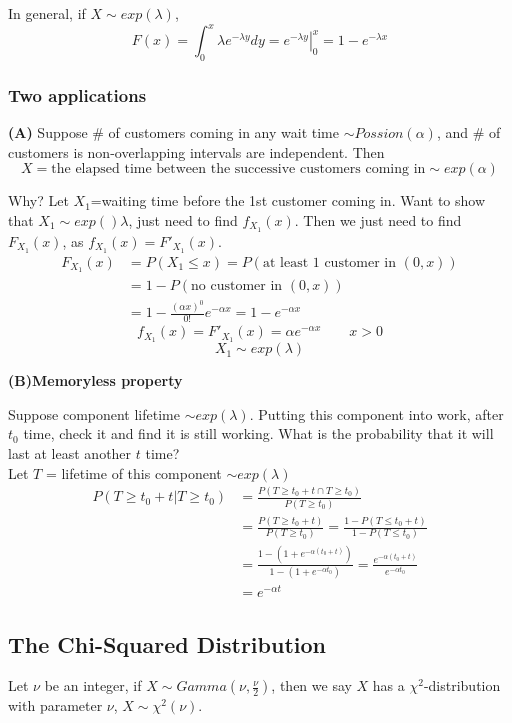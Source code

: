 In general, if $X\sim exp(\lambda)$,
\[F(x)=\int_0^{x} \lambda e^{-\lambda y} dy=\left. e^{-\lambda y}\right|_{0}^{x}=1-e^{-\lambda x}\]

\subsubsection{Two applications}
\textbf{(A)} Suppose \# of customers coming in any wait time $\sim Possion(\alpha)$, and \# of customers is non-overlapping intervals are independent. Then
\[X= \text{the elapsed time between the successive customers coming in}\sim exp(\alpha)\]

Why? Let $X_1$=waiting time before the 1st customer coming in. Want to show that $X_1 \sim exp()\lambda$, just need to find $f_{X_1}(x)$. Then we just need to find $F_{X_1}(x)$, as $f_{X_1}(x)=F'_{X_1}(x)$.
\begin{align*}
F_{X_1}(x)&= P(X_1\leq x)=P(\text{at least 1 customer in }(0,x)) \\
&= 1-P(\text{no customer in }(0,x)) \\
&=1-\frac{(\alpha x)^0}{0!}e^{-\alpha x}=1-e^{-\alpha x}
\end{align*}
\[f_{X_1}(x)=F'_{X_1}(x)=\alpha e^{-\alpha x} \qquad x>0\]
\[X_1 \sim exp(\lambda)\]


\textbf{(B)Memoryless property}

Suppose component lifetime $\sim exp(\lambda)$. Putting this component into work, after $t_0$ time, check it and find it is still working. What is the probability that it will last at least another $t$ time?\\
Let $T$ = lifetime of this component $\sim exp(\lambda)$
\begin{align*}
P(T\geq t_0+t|T \geq t_0)&=\frac{P(T\geq t_0+t \cap T \geq t_0)}{P(T \geq t_0)} \\
&=\frac{P(T\geq t_0+t)}{P(T \geq t_0)}=\frac{1-P(T\leq t_0+t)}{1-P(T \leq t_0)} \\
&=\frac{1-(1+e^{-\alpha(t_0+t)})}{1-(1+e^{-\alpha t_0})}=\frac{e^{-\alpha(t_0+t)}}{e^{-\alpha t_0}} \\
&=e^{-\alpha t}
\end{align*}

\subsection{The Chi-Squared Distribution}
Let $\nu$ be an integer, if $X \sim Gamma(\nu,\frac{\nu}{2})$, then we say $X$ has a $\chi^2$-distribution with parameter $\nu$, $X \sim \chi^2 (\nu)$.

